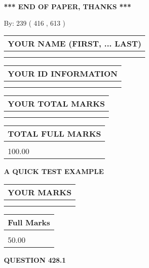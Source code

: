 \documentclass[12pt]{article}
\begin{document}
\vspace{1.0in} 
{\textbf{\large{ *** END OF PAPER, THANKS *** }}} 
   
   
\hspace{1.0in} By: 
 239 ( 416 ,  613 )
   
   
   
   
\newpage 
\setcounter{page}{ 
   428001 } 
   
   
   
   
\noindent\begin{tabular}{|l|}
\hline
YOUR NAME (FIRST, ... LAST)  \\
\hline
 \\ 
 \\ 
\hline
\end{tabular}
\hspace{0.05in} \begin{tabular}{|l|}
\hline
 YOUR   ID   INFORMATION  \\
\hline
 \\ 
 \\ 
\hline
\end{tabular}
   
   
\vspace{0.2in}\noindent\begin{tabular}{|l|}
\hline
YOUR TOTAL MARKS  \\
\hline
 \\ 
 \\ 
\hline
\end{tabular}
\hspace{0.05in} \begin{tabular}{|l|}
\hline
TOTAL FULL MARKS  \\
\hline
 \\ 
100.00 \\
\hline
\end{tabular}
   
   
 \vspace{0.2in}
{\LARGE {\textbf{ A QUICK TEST EXAMPLE}}}
   
   
  
\vspace{0.2in}
  
\noindent\begin{tabular}{|l|}
\hline
 YOUR MARKS  \\
\hline
 \\ 
 \\ 
\hline
\end{tabular}
\hspace{0.05in} \begin{tabular}{|l|}
\hline
 Full Marks  \\
\hline
 \\ 
50.00 \\
\hline
\end{tabular}
{\textbf{\Large{QUESTION
428.1 
}}}
  
\end{document}

